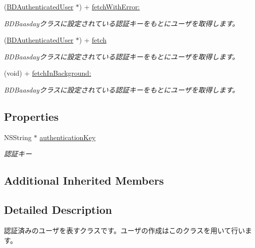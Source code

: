 \begin{DoxyCompactItemize}
(\hyperlink{interface_b_d_authenticated_user}{B\-D\-Authenticated\-User} $\ast$) + \hyperlink{interface_b_d_authenticated_user_a269a9fbd9bb90595d3b96330bc2afc1a}{fetch\-With\-Error\-:}
\begin{DoxyCompactList}\small\item\em B\-D\-Baasdayクラスに設定されている認証キーをもとにユーザを取得します。 \end{DoxyCompactList}\item 
(\hyperlink{interface_b_d_authenticated_user}{B\-D\-Authenticated\-User} $\ast$) + \hyperlink{interface_b_d_authenticated_user_a74733c1f5a2537c1dceffce72effb93e}{fetch}
\begin{DoxyCompactList}\small\item\em B\-D\-Baasdayクラスに設定されている認証キーをもとにユーザを取得します。 \end{DoxyCompactList}\item 
(void) + \hyperlink{interface_b_d_authenticated_user_ad51bed700833f0d6a5cc5b2b017fef97}{fetch\-In\-Background\-:}
\begin{DoxyCompactList}\small\item\em B\-D\-Baasdayクラスに設定されている認証キーをもとにユーザを取得します。 \end{DoxyCompactList}\end{DoxyCompactItemize}
\subsection*{Properties}
\begin{DoxyCompactItemize}
\item 
N\-S\-String $\ast$ \hyperlink{interface_b_d_authenticated_user_adbd855742b73eb440cb118ff190e8851}{authentication\-Key}
\begin{DoxyCompactList}\small\item\em 認証キー \end{DoxyCompactList}\end{DoxyCompactItemize}
\subsection*{Additional Inherited Members}


\subsection{Detailed Description}
認証済みのユーザを表すクラスです。ユーザの作成はこのクラスを用いて行います。 

